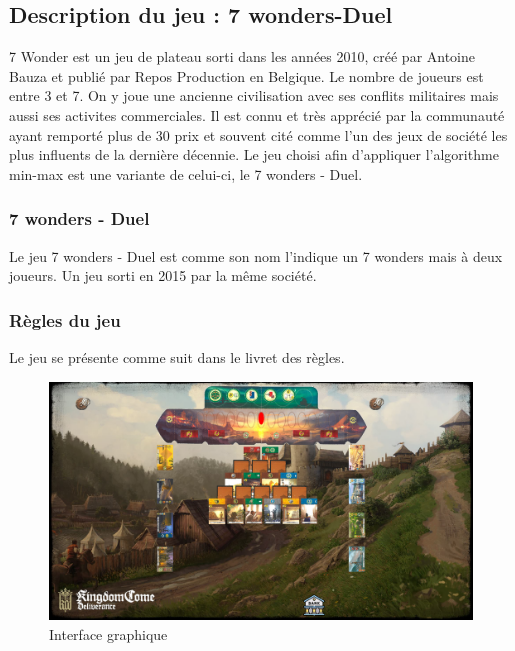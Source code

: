 \documentclass[12pt]{article}
\begin{document}
	\subsection{Description du jeu : 7 wonders-Duel}
    	7 Wonder est un jeu de plateau sorti dans les années 2010, créé par Antoine Bauza et publié par Repos Production en Belgique. Le nombre de joueurs est entre 3 et 7. On y joue une ancienne
    	civilisation avec ses conflits militaires mais aussi ses activites commerciales. Il est connu et très apprécié par la communauté ayant remporté plus de 30 prix et souvent cité comme l'un des jeux de société les plus influents de la dernière décennie\cite{wiki_7_wonder}. Le jeu choisi afin d'appliquer l'algorithme min-max est une variante de celui-ci, le 7 wonders - Duel.

	\subsubsection{7 wonders - Duel}
    	Le jeu 7 wonders - Duel est comme son nom l'indique un 7 wonders mais à deux joueurs. Un jeu sorti en 2015 par la même société.
    
    	\subsubsection{Règles du jeu}
    	Le jeu se présente comme suit dans le livret des règles\cite{regle_7_wonder_duel}.
    
        \begin{figure}[htbp]
            \centering
            \includegraphics[width=.9\linewidth]{images/plateau_debut.png}
            \caption{Interface graphique}
            \label{fig:interface_graphique}
        \end{figure}
    
\end{document}
